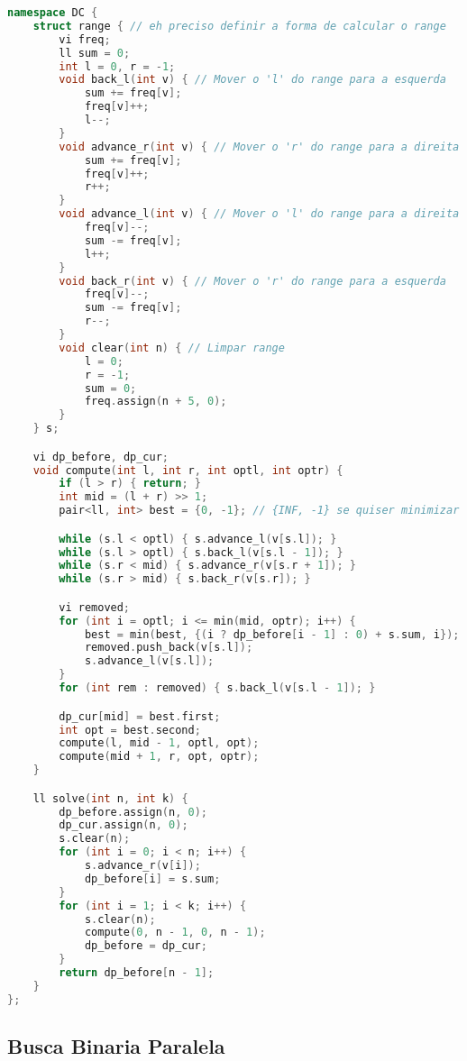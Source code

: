 \documentclass[11pt, a4paper, twoside]{article}
\begin{document}
\begin{lstlisting}[language=C++]
namespace DC {
    struct range { // eh preciso definir a forma de calcular o range
        vi freq;
        ll sum = 0;
        int l = 0, r = -1;
        void back_l(int v) { // Mover o 'l' do range para a esquerda
            sum += freq[v];
            freq[v]++;
            l--;
        }
        void advance_r(int v) { // Mover o 'r' do range para a direita
            sum += freq[v];
            freq[v]++;
            r++;
        }
        void advance_l(int v) { // Mover o 'l' do range para a direita
            freq[v]--;
            sum -= freq[v];
            l++;
        }
        void back_r(int v) { // Mover o 'r' do range para a esquerda
            freq[v]--;
            sum -= freq[v];
            r--;
        }
        void clear(int n) { // Limpar range
            l = 0;
            r = -1;
            sum = 0;
            freq.assign(n + 5, 0);
        }
    } s;

    vi dp_before, dp_cur;
    void compute(int l, int r, int optl, int optr) {
        if (l > r) { return; }
        int mid = (l + r) >> 1;
        pair<ll, int> best = {0, -1}; // {INF, -1} se quiser minimizar

        while (s.l < optl) { s.advance_l(v[s.l]); }
        while (s.l > optl) { s.back_l(v[s.l - 1]); }
        while (s.r < mid) { s.advance_r(v[s.r + 1]); }
        while (s.r > mid) { s.back_r(v[s.r]); }

        vi removed;
        for (int i = optl; i <= min(mid, optr); i++) {
            best = min(best, {(i ? dp_before[i - 1] : 0) + s.sum, i}); // min() se quiser minimizar
            removed.push_back(v[s.l]);
            s.advance_l(v[s.l]);
        }
        for (int rem : removed) { s.back_l(v[s.l - 1]); }

        dp_cur[mid] = best.first;
        int opt = best.second;
        compute(l, mid - 1, optl, opt);
        compute(mid + 1, r, opt, optr);
    }

    ll solve(int n, int k) {
        dp_before.assign(n, 0);
        dp_cur.assign(n, 0);
        s.clear(n);
        for (int i = 0; i < n; i++) {
            s.advance_r(v[i]);
            dp_before[i] = s.sum;
        }
        for (int i = 1; i < k; i++) {
            s.clear(n);
            compute(0, n - 1, 0, n - 1);
            dp_before = dp_cur;
        }
        return dp_before[n - 1];
    }
};
\end{lstlisting}

\subsection{Busca Binaria Paralela}
\end{document}
